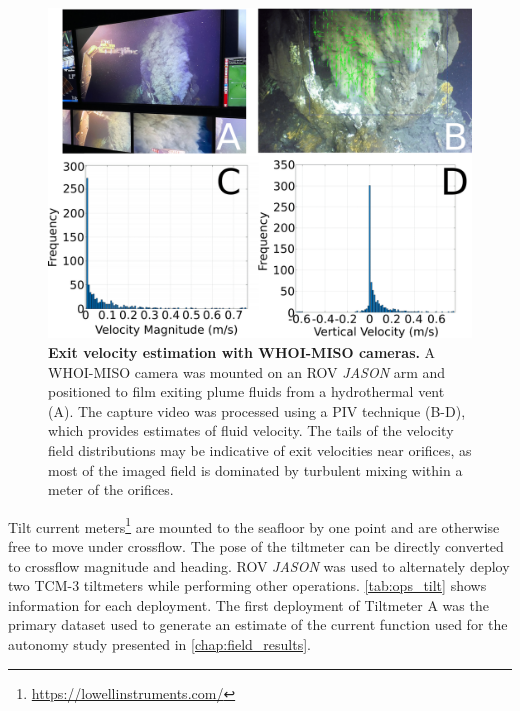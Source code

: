 \begin{figure}[h!]
  \centering
  \includegraphics[width=1.0\columnwidth]{figures/ops_miso.png}
  \caption[Exit velocity estimation with WHOI-MISO cameras.]{\textbf{Exit velocity estimation with WHOI-MISO cameras.} A WHOI-MISO camera was mounted on an ROV \emph{JASON} arm and positioned to film exiting plume fluids from a hydrothermal vent (A). The capture video was processed using a PIV technique (B-D), which provides estimates of fluid velocity. The tails of the velocity field distributions may be indicative of exit velocities near orifices, as most of the imaged field is dominated by turbulent mixing within a meter of the orifices.}
  \label{fig:ops_miso}
\end{figure}

Tilt current meters\footnote{\url{https://lowellinstruments.com/}} are mounted to the seafloor by one point and are otherwise free to move under crossflow. The pose of the tiltmeter can be directly converted to crossflow magnitude and heading. ROV \emph{JASON} was used to alternately deploy two TCM-3 tiltmeters while performing other operations. \cref{tab:ops_tilt} shows information for each deployment. The first deployment of Tiltmeter A was the primary dataset used to generate an estimate of the current function used for the autonomy study presented in \cref{chap:field_results}. 

